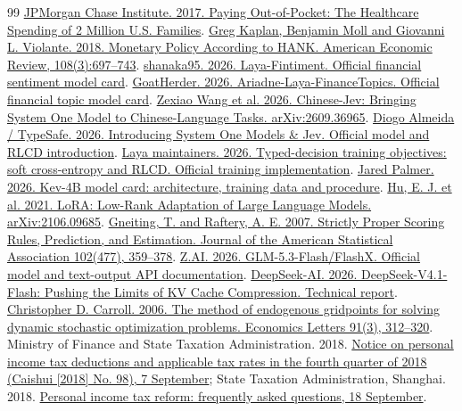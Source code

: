 \documentclass[10pt]{article}
\begin{document}
\begin{thebibliography}{99}
 \href{https://www.jpmorganchase.com/institute/all-topics/household-financial-health/report-affording-healthcare}{JPMorgan Chase Institute. 2017. Paying Out-of-Pocket: The Healthcare Spending of 2 Million U.S. Families}.
 \href{https://www.aeaweb.org/articles?id=10.1257/aer.20160042}{Greg Kaplan, Benjamin Moll and Giovanni L. Violante. 2018. Monetary Policy According to HANK. American Economic Review, 108(3):697–743}.
 \href{https://huggingface.co/shanaka95/laya-fintiment}{shanaka95. 2026. Laya-Fintiment. Official financial sentiment model card}.
 \href{https://huggingface.co/GoatHerder/Ariadne-Laya-FinanceTopics}{GoatHerder. 2026. Ariadne-Laya-FinanceTopics. Official financial topic model card}.
 \href{https://arxiv.org/abs/2609.36965}{Zexiao Wang et al. 2026. Chinese-Jev: Bringing System One Model to Chinese-Language Tasks. arXiv:2609.36965}.
 \href{https://typesafe.ai/blog/introducing-system-one-models-and-jev}{Diogo Almeida / TypeSafe. 2026. Introducing System One Models \& Jev. Official model and RLCD introduction}.
 \href{https://github.com/NandhaKishorM/laya/blob/main/laya/train.py}{Laya maintainers. 2026. Typed-decision training objectives: soft cross-entropy and RLCD. Official training implementation}.
 \href{https://raw.githubusercontent.com/jaredpalmer/kev/main/docs/model-cards/kev-4b.md}{Jared Palmer. 2026. Kev-4B model card: architecture, training data and procedure}.
 \href{https://arxiv.org/abs/2106.09685}{Hu, E. J. et al. 2021. LoRA: Low-Rank Adaptation of Large Language Models. arXiv:2106.09685}.
 \href{https://doi.org/10.1198/016214506000001437}{Gneiting, T. and Raftery, A. E. 2007. Strictly Proper Scoring Rules, Prediction, and Estimation. Journal of the American Statistical Association 102(477), 359--378}.
 \href{https://docs.z.ai/guides/vlm/glm-5.3-flash}{Z.AI. 2026. GLM-5.3-Flash/FlashX. Official model and text-output API documentation}.
 \href{https://huggingface.co/deepseek-ai/DeepSeek-V4.1-Flash/blob/main/DeepSeek_V41_Tech_Report.pdf}{DeepSeek-AI. 2026. DeepSeek-V4.1-Flash: Pushing the Limits of KV Cache Compression. Technical report}.
 \href{https://doi.org/10.1016/j.econlet.2005.09.013}{Christopher D. Carroll. 2006. The method of endogenous gridpoints for solving dynamic stochastic optimization problems. Economics Letters 91(3), 312--320}.
 Ministry of Finance and State Taxation Administration. 2018. \href{https://12366.chinatax.gov.cn/bzds/072/072-5-9.html}{Notice on personal income tax deductions and applicable tax rates in the fourth quarter of 2018 (Caishui [2018] No. 98), 7 September}; State Taxation Administration, Shanghai. 2018. \href{https://shanghai.chinatax.gov.cn/tax/xhtax/tzgg/tzl/201809/t441835.html}{Personal income tax reform: frequently asked questions, 18 September}.
\end{thebibliography}
\endgroup
\end{document}
